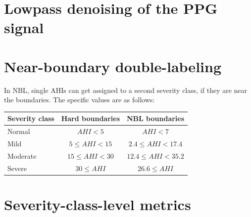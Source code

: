 \section{Lowpass denoising of the PPG signal \label{Apx-Denoise}}


\section{Near-boundary double-labeling \label{Apx-NBL}}

In NBL, single AHIs can get assigned to a second severity class, if they are near the boundaries. The specific values are as follows:

\renewcommand{\arraystretch}{1.5}
\begin{table}[h!]
    \centering
    \begin{tabular}{ l c c }
        Severity class & Hard boundaries & NBL boundaries \\
        \hline
        Normal   & $ AHI < 5 $         & $ AHI < 7 $             \\
        Mild     & $ 5 \le AHI < 15 $  & $ 2.4 \le AHI < 17.4 $  \\
        Moderate & $ 15 \le AHI < 30 $ & $ 12.4 \le AHI < 35.2 $ \\
        Severe   & $ 30 \le AHI $      & $ 26.6 \le AHI $        \\
    \end{tabular}
\end{table}

\section{Severity-class-level metrics \label{Apx-Severity-Metrics}}

